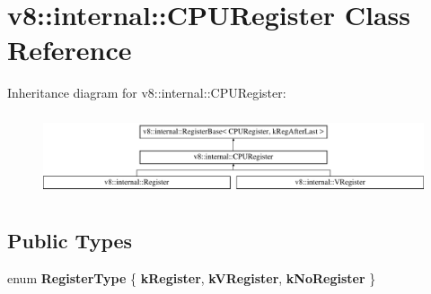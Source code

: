 \hypertarget{classv8_1_1internal_1_1CPURegister}{}\section{v8\+:\+:internal\+:\+:C\+P\+U\+Register Class Reference}
\label{classv8_1_1internal_1_1CPURegister}
Inheritance diagram for v8\+:\+:internal\+:\+:C\+P\+U\+Register\+:\begin{figure}[H]
\begin{center}
\leavevmode
\includegraphics[height=2.434783cm]{classv8_1_1internal_1_1CPURegister}
\end{center}
\end{figure}
\subsection*{Public Types}
\begin{DoxyCompactItemize}
\item 
\mbox{\label{classv8_1_1internal_1_1CPURegister_a3f3673d49114631e793e2991cd765054}} 
enum {\bfseries Register\+Type} \{ {\bfseries k\+Register}, 
{\bfseries k\+V\+Register}, 
{\bfseries k\+No\+Register}
 \}
\end{DoxyCompactItemize}

